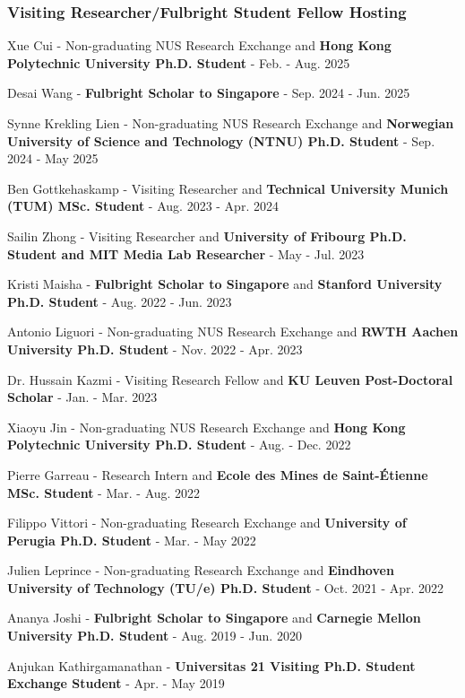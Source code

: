 \documentclass[10pt,a4paper]{article}
\begin{document}
\begin{small}
\subsubsection*{Visiting Researcher/Fulbright Student Fellow Hosting}
\begin{etaremune}
\item
Xue Cui - Non-graduating NUS Research Exchange and \textbf{Hong Kong Polytechnic University Ph.D. Student} - Feb. - Aug. 2025
\item
Desai Wang - \textbf{Fulbright Scholar to Singapore} - Sep. 2024 - Jun. 2025
\item
Synne Krekling Lien - Non-graduating NUS Research Exchange and \textbf{Norwegian University of Science and Technology (NTNU) Ph.D. Student} - Sep. 2024 - May 2025
\item
Ben Gottkehaskamp - Visiting Researcher and \textbf{Technical University Munich (TUM) MSc. Student} - Aug. 2023 - Apr. 2024
\item
Sailin Zhong - Visiting Researcher and \textbf{University of Fribourg Ph.D. Student and MIT Media Lab Researcher} - May - Jul. 2023
\item
Kristi Maisha - \textbf{Fulbright Scholar to Singapore} and \textbf{Stanford University Ph.D. Student} - Aug. 2022 - Jun. 2023
\item
Antonio Liguori - Non-graduating NUS Research Exchange and \textbf{RWTH Aachen University Ph.D. Student} - Nov. 2022 - Apr. 2023
\item
Dr. Hussain Kazmi - Visiting Research Fellow and \textbf{KU Leuven Post-Doctoral Scholar} - Jan. - Mar. 2023
\item
Xiaoyu Jin - Non-graduating NUS Research Exchange and \textbf{Hong Kong Polytechnic University Ph.D. Student} - Aug. - Dec. 2022
\item
Pierre Garreau - Research Intern and \textbf{Ecole des Mines de Saint-Étienne MSc. Student} - Mar. - Aug. 2022
\item
Filippo Vittori - Non-graduating Research Exchange and \textbf{University of Perugia Ph.D. Student} - Mar. - May 2022
\item
Julien Leprince - Non-graduating Research Exchange and \textbf{Eindhoven University of Technology (TU/e) Ph.D. Student} - Oct. 2021 - Apr. 2022
\item 
Ananya Joshi - \textbf{Fulbright Scholar to Singapore} and \textbf{Carnegie Mellon University Ph.D. Student} - Aug. 2019 - Jun. 2020
\item
Anjukan Kathirgamanathan - \textbf{Universitas 21 Visiting Ph.D. Student Exchange Student} - Apr. - May 2019
\end{etaremune}


\end{small}
\end{document}
